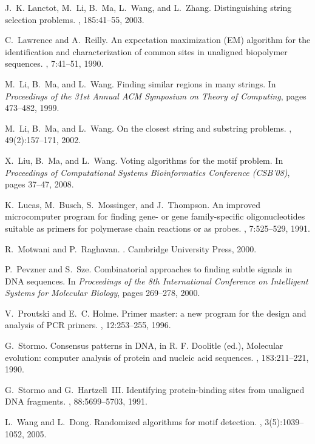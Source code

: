 \documentclass[11pt]{article}
\begin{document}
\begin{thebibliography}{10}
J.~K. Lanctot, M.~Li, B.~Ma, L.~Wang, and L.~Zhang.
\newblock Distinguishing string selection problems.
, 185:41--55, 2003.

C.~Lawrence and A.~Reilly.
\newblock An expectation maximization ({{\rm EM}}) algorithm for the
  identification and characterization of common sites in unaligned biopolymer
  sequences.
, 7:41--51, 1990.

M.~Li, B.~Ma, and L.~Wang.
\newblock Finding similar regions in many strings.
\newblock In {\em Proceedings of the 31st Annual ACM Symposium on Theory of
  Computing}, pages 473--482, 1999.

M.~Li, B.~Ma, and L.~Wang.
\newblock On the closest string and substring problems.
, 49(2):157--171, 2002.

X.~Liu, B.~Ma, and L.~Wang.
\newblock Voting algorithms for the motif problem.
\newblock In {\em Proceedings of Computational Systems Bioinformatics
  Conference (CSB'08)}, pages 37--47, 2008.

K.~Lucas, M.~Busch, S.~Mossinger, and J.~Thompson.
\newblock An improved microcomputer program for finding gene- or gene
  family-specific oligonucleotides suitable as primers for polymerase chain
  reactions or as probes.
, 7:525--529, 1991.

R.~Motwani and P.~Raghavan.
.
\newblock Cambridge University Press, 2000.

P.~Pevzner and S.~Sze.
\newblock Combinatorial approaches to finding subtle signals in {{DNA}}
  sequences.
\newblock In {\em {\it Proceedings of the 8th International Conference on
  Intelligent Systems for Molecular Biology}}, pages 269--278, 2000.

V.~Proutski and E.~C. Holme.
\newblock Primer master: a new program for the design and analysis of {{PCR}}
  primers.
, 12:253--255, 1996.

G.~Stormo.
\newblock Consensus patterns in {{\rm DNA}}, in {{\rm R. F. Doolitle}} (ed.),
  {{M}}olecular evolution: computer analysis of protein and nucleic acid
  sequences.
, 183:211--221, 1990.

G.~Stormo and G.~Hartzell{{\rm\ }}III.
\newblock Identifying protein-binding sites from unaligned {{\rm DNA}}
  fragments.
, 88:5699--5703, 1991.

L.~Wang and L.~Dong.
\newblock Randomized algorithms for motif detection.
,
  3(5):1039--1052, 2005.

\end{thebibliography}
\end{document}
